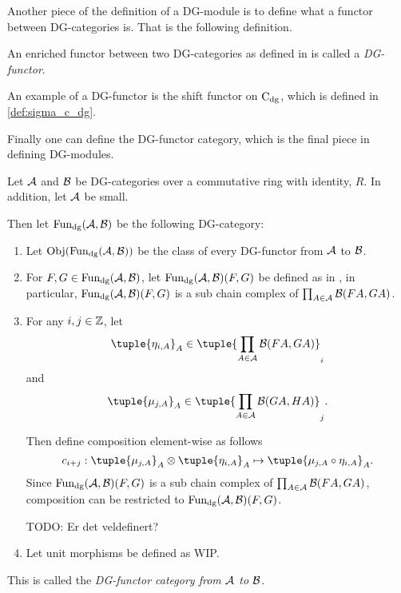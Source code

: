 Another piece of the definition of a DG-module is to define what a functor between DG-categories is. That is the following definition.

\begin{definition}[DG-functor]
    An enriched functor between two DG-categories as defined in \cite[Definition 6.2.3]{Borceux_1994} is called a \emph{DG-functor}.
\end{definition}

An example of a DG-functor is the shift functor on \( \operatorname{C}_{\operatorname{dg}} \), which is defined in \autoref{def:sigma_c_dg}.

Finally one can define the DG-functor category, which is the final piece in defining DG-modules.

\begin{definition}
    \label{def:dg_functor_category}
    Let \( {\mathcal{A}} \) and \( {\mathcal{B}} \) be DG-categories over a commutative ring with identity, \( R \). In addition, let \( {\mathcal{A}} \) be small.

    Then let \( \operatorname{Fun}_{\operatorname{dg}}({\mathcal{A}}, {\mathcal{B}}) \) be the following DG-category:
    \begin{enumerate}
        \item{
            Let \( \operatorname{Obj}(\operatorname{Fun}_{\operatorname{dg}}({\mathcal{A}}, {\mathcal{B}})) \) be the class of every DG-functor from \( {\mathcal{A}} \) to \( {\mathcal{B}} \).
        }
        \item{
            For \( F, G \in \operatorname{Fun}_{\operatorname{dg}}({\mathcal{A}}, {\mathcal{B}}) \), let \( \operatorname{Fun}_{\operatorname{dg}}({\mathcal{A}}, {\mathcal{B}})(F, G) \) be defined as in \cite[Proposition 6.3.1]{Borceux_1994}, in particular, \( \operatorname{Fun}_{\operatorname{dg}}({\mathcal{A}}, {\mathcal{B}})(F, G) \) is a sub chain complex of \( \prod_{A \in {\mathcal{A}}} {\mathcal{B}}(FA, GA) \).
        }
        \item {
            For any \( i, j \in {\mathbb{Z}} \), let
            \[
                \tuple{\eta_{i, A}}_A \in \tuple{\prod_{A \in \Ac} \Bc(FA, GA)}_i
            \]
            and
            \[
                \tuple{\mu_{j, A}}_A \in \tuple{\prod_{A \in \Ac} \Bc(GA, HA)}_j.
            \]

            Then define composition element-wise as follows
            \[
                c_{i + j}: \tuple{\mu_{j, A}}_A \otimes \tuple{\eta_{i, A}}_A \mapsto \tuple{\mu_{j, A} \circ \eta_{i, A}}_A.
            \]
            Since \( \operatorname{Fun}_{\operatorname{dg}}({\mathcal{A}}, {\mathcal{B}})(F, G) \) is a sub chain complex of \( \prod_{A \in {\mathcal{A}}} {\mathcal{B}}(FA, GA) \), composition can be restricted to \( \operatorname{Fun}_{\operatorname{dg}}({\mathcal{A}}, {\mathcal{B}})(F, G) \).

            TODO: Er det veldefinert?
        }
        \item {
            Let unit morphisms be defined as WIP.
        }
    \end{enumerate}
    This is called the \emph{DG-functor category from \( {\mathcal{A}} \) to \( {\mathcal{B}} \)}.
\end{definition}

